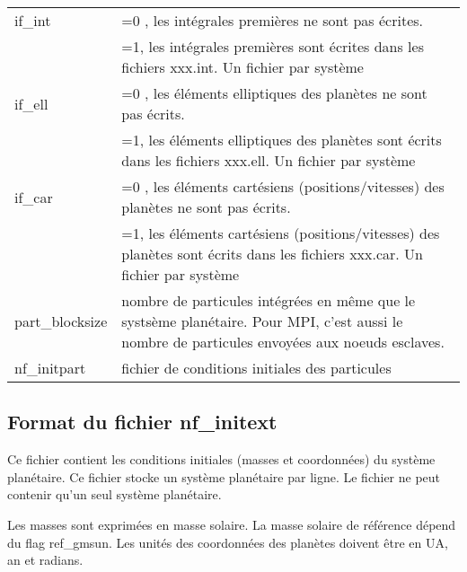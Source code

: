 \documentclass[11pt]{article}
\begin{document}
\begin{tabularx}{\textwidth}{|l|X|}
 if\_int & =0 , les int\'egrales premi\`eres ne sont pas \'ecrites.\\
&=1, les int\'egrales premi\`eres sont \'ecrites dans les fichiers xxx.int. Un fichier par syst\`eme\\ \hline
 
 if\_ell & =0 , les \'el\'ements elliptiques des plan\`etes ne sont pas \'ecrits.\\
&=1, les \'el\'ements elliptiques  des plan\`etes sont \'ecrits dans les fichiers xxx.ell. Un fichier par syst\`eme\\ \hline
 
 if\_car &  =0 , les \'el\'ements cart\'esiens (positions/vitesses)  des plan\`etes  ne sont pas \'ecrits.\\
&=1, les \'el\'ements cart\'esiens (positions/vitesses)  des plan\`etes  sont \'ecrits dans les fichiers xxx.car. Un fichier par syst\`eme\\ \hline 

part\_blocksize & nombre de particules int\'egr\'ees en m\^eme que le systs\`eme plan\'etaire. Pour MPI, c'est aussi le nombre de particules envoy\'ees aux noeuds esclaves.\\ \hline
nf\_initpart & fichier de conditions initiales des particules\\ \hline
 \end{tabularx}


\subsection{Format du fichier nf\_initext}

Ce fichier contient les conditions initiales (masses et coordonn\'ees) du syst\`eme plan\'etaire. 
Ce fichier stocke un syst\`eme plan\'etaire par ligne.
Le fichier ne peut contenir qu'un seul syst\`eme plan\'etaire.

Les masses sont exprimées en masse solaire.  La masse solaire de référence dépend du flag ref\_gmsun.
Les unit\'es des coordonn\'ees des plan\`etes doivent \^etre en UA, an et radians.
\end{document}
